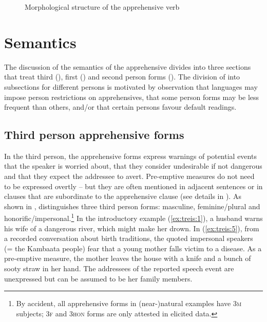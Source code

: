 \documentclass[output=paper,colorlinks,citecolor=brown,]{langscibook}
\begin{document}
\begin{figure}
    \caption{Morphological structure of the apprehensive verb}
    \label{fig:treis:4}
\end{figure}

\section{Semantics}\label{sec:treis:3}

The discussion of the semantics of the apprehensive divides into three sections that treat third (), first () and second person forms (). The division of  into subsections for different persons is motivated by  observation that languages may impose person restrictions on apprehensives, that some person forms may be less frequent than others, and/or that certain persons favour default readings.

\subsection{Third person apprehensive forms}\label{sec:treis:3.1}

In the third person, the apprehensive forms express warnings of potential events that the speaker is worried about, that they consider undesirable if not dangerous and that they expect the addressee to avert. Pre-emptive measures do not need to be expressed overtly -- but they are often mentioned in adjacent sentences or in clauses that are subordinate to the apprehensive clause (see details in ). As shown in ,  distinguishes three third person forms: masculine, feminine\slash plural and honorific\slash impersonal.\footnote{By accident, all apprehensive forms in (near-)natural examples have \textsc{3m} subjects; \textsc{3f} and \textsc{3hon} forms are only attested in elicited data.}  In the introductory example (\ref{ex:treis:1}), a husband warns his wife of a dangerous river, which might make her drown. In (\ref{ex:treis:5}), from a recorded conversation about birth traditions, the quoted impersonal speakers (= the Kambaata people) fear that a young mother falls victim to a disease. As a pre-emptive measure, the mother leaves the house with a knife and a bunch of sooty straw in her hand. The addressees of the reported speech event are unexpressed but can be assumed to be her family members.
\end{document}
